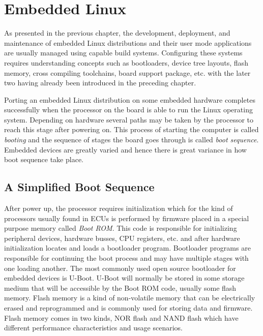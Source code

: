 
\section{Embedded Linux}

As presented in the previous chapter, the development, deployment, and maintenance of embedded Linux distributions and their user mode applications are usually managed using capable build systems. Configuring these systems requires understanding concepts such as bootloaders, device tree layouts, flash memory, cross compiling toolchains, board support package, etc. with the later two having already been introduced in the preceding chapter.

Porting an embedded Linux distribution on some embedded hardware completes successfully when the processor on the board is able to run the Linux operating system. Depending on hardware several paths may be taken by the processor to reach this stage after powering on. This process of starting the computer is called \textit{booting} and the sequence of stages the board goes through is called \textit{boot sequence}. Embedded devices are greatly varied and hence there is great variance in how boot sequence take place.

\subsection{A Simplified Boot Sequence}

After power up, the processor requires initialization which for the kind of processors usually found in ECUs is performed by firmware placed in a special purpose memory called \textit{Boot ROM}. This code is responsible for initializing peripheral devices, hardware busses, CPU registers, etc. and after hardware initialization locates and loads a bootloader program. Bootloader programs are responsible for continuing the boot process and may have multiple stages with one loading another. The most commonly used open source bootloader for embedded devices is U-Boot. U-Boot will normally be stored in some storage medium that will be accessible by the Boot ROM code, usually some flash memory. Flash memory is a kind of non-volatile memory that can be electrically erased and reprogrammed and is commonly used for storing data and firmware. Flash memory comes in two kinds, NOR flash and NAND flash which have different performance characteristics and usage scenarios.

